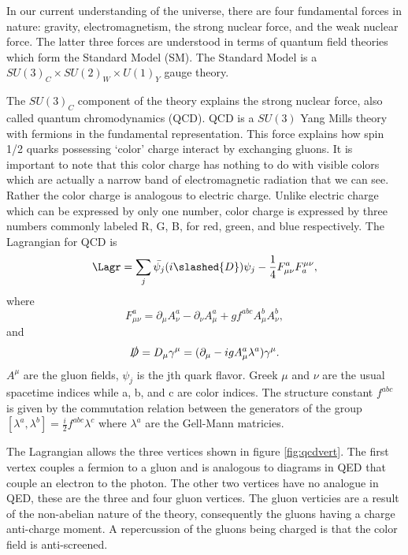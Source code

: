 
In our current understanding of the universe, there are four fundamental forces in nature: gravity, electromagnetism, the strong nuclear force, and the weak nuclear force.
The latter three forces are understood in terms of quantum field theories which form the Standard Model (SM).
The Standard Model is a $SU(3)_C\times SU(2)_W\times U(1)_Y$ gauge theory.

The $SU(3)_C$ component of the theory explains the strong nuclear force, also called quantum chromodynamics (QCD).
QCD is a $SU(3)$ Yang Mills theory with fermions in the fundamental representation.
This force explains how spin 1/2 quarks possessing `color' charge interact by exchanging gluons.
It is important to note that this color charge has nothing to do with visible colors which are actually a narrow band of electromagnetic radiation that we can see.
Rather the color charge is analogous to electric charge.
Unlike electric charge which can be expressed by only one number, color charge is expressed by three numbers commonly labeled R, G, B, for red, green, and blue respectively.
The Lagrangian for QCD is
\begin{equation}
  \label{eq:qcd}
  \Lagr = \sum_j\bar{\psi_j}(i\slashed{D})\psi_j-\frac{1}{4}F^a_{\mu\nu}F^{\mu\nu}_a,
\end{equation}
where
\begin{equation}
  F^a_{\mu\nu}=\partial_\mu A^a_\nu-\partial_\nu A^a_\mu+gf^{abc}A^b_\mu A^b_\nu,
\end{equation}
and
\begin{equation}
  \slashed{D}=D_\mu\gamma^\mu=(\partial_\mu-igA^a_\mu\lambda^a)\gamma^\mu.
\end{equation}
$A^\mu$ are the gluon fields, $\psi_j$ is the jth quark flavor.
Greek $\mu$ and $\nu$ are the usual spacetime indices while a, b, and c are color indices.
The structure constant $f^{abc}$ is given by the commutation relation between the generators of the group $[\lambda^a,\lambda^b]=\frac{i}{2}f^{abc}\lambda^c$ where $\lambda^a$ are the Gell-Mann matricies.

The Lagrangian allows the three vertices shown in figure \ref{fig:qcdvert}.
The first vertex couples a fermion to a gluon and is analogous to diagrams in QED that couple an electron to the photon.
The other two vertices have no analogue in QED, these are the three and four gluon vertices.
The gluon verticies are a result of the non-abelian nature of the theory, consequently the gluons having a charge anti-charge moment.
A repercussion of the gluons being charged is that the color field is anti-screened.

